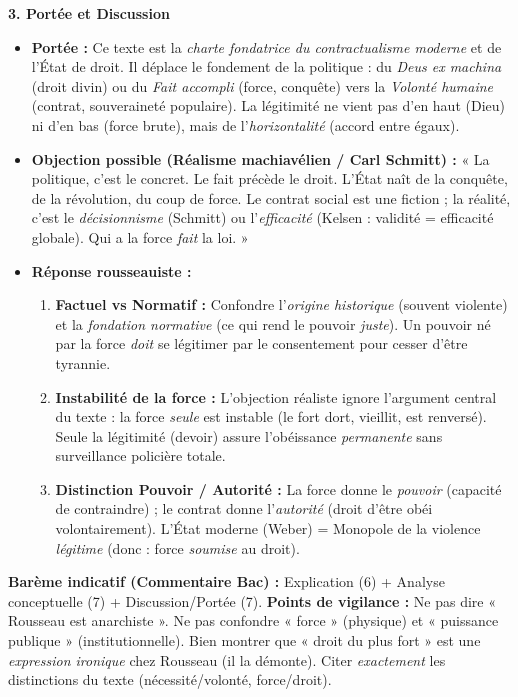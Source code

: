 \documentclass[11pt]{article}
\begin{document}
\begin{corrige}
\textbf{3. Portée et Discussion}
\begin{itemize}
    \item \textbf{Portée :} Ce texte est la \emph{charte fondatrice du contractualisme moderne} et de l'État de droit. Il déplace le fondement de la politique : du \emph{Deus ex machina} (droit divin) ou du \emph{Fait accompli} (force, conquête) vers la \emph{Volonté humaine} (contrat, souveraineté populaire). La légitimité ne vient pas d'en haut (Dieu) ni d'en bas (force brute), mais de l'\emph{horizontalité} (accord entre égaux).
    \item \textbf{Objection possible (Réalisme machiavélien / Carl Schmitt) :} « La politique, c'est le concret. Le fait précède le droit. L'État naît de la conquête, de la révolution, du coup de force. Le contrat social est une fiction ; la réalité, c'est le \emph{décisionnisme} (Schmitt) ou l'\emph{efficacité} (Kelsen : validité = efficacité globale). Qui a la force \emph{fait} la loi. »
    \item \textbf{Réponse rousseauiste :}
    \begin{enumerate}
        \item \textbf{Factuel vs Normatif :} Confondre l'\emph{origine historique} (souvent violente) et la \emph{fondation normative} (ce qui rend le pouvoir \emph{juste}). Un pouvoir né par la force \emph{doit} se légitimer par le consentement pour cesser d'être tyrannie.
        \item \textbf{Instabilité de la force :} L'objection réaliste ignore l'argument central du texte : la force \emph{seule} est instable (le fort dort, vieillit, est renversé). Seule la légitimité (devoir) assure l'obéissance \emph{permanente} sans surveillance policière totale.
        \item \textbf{Distinction Pouvoir / Autorité :} La force donne le \emph{pouvoir} (capacité de contraindre) ; le contrat donne l'\emph{autorité} (droit d'être obéi volontairement). L'État moderne (Weber) = Monopole de la violence \emph{légitime} (donc : force \emph{soumise} au droit).
    \end{enumerate}
\end{itemize}

\textbf{Barème indicatif (Commentaire Bac) :} Explication (6) + Analyse conceptuelle (7) + Discussion/Portée (7).
\textbf{Points de vigilance :} Ne pas dire « Rousseau est anarchiste ». Ne pas confondre « force » (physique) et « puissance publique » (institutionnelle). Bien montrer que « droit du plus fort » est une \emph{expression ironique} chez Rousseau (il la démonte). Citer \emph{exactement} les distinctions du texte (nécessité/volonté, force/droit).
\end{corrige}
\end{document}
